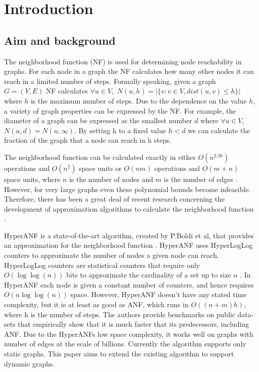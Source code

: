 \chapter{Introduction}

\section{Aim and background}
The neighborhood function (NF) is used for determining node reachability in graphs. For each node in a graph the NF calculates how many other nodes it can reach in a limited number of steps. Formally speaking, given a graph $G = (V,E)$ NF calculates $\forall u \in V,$ $N(u,h) = |\{v : v \in V, dist(u,v) \leq h \}|$ where $h$ is the maximum number of steps. Due to the dependence on the value $h$, a variety of graph properties can be expressed by the NF. For example, the diameter of a graph can be expressed as the smallest number $d$ where $ \forall u \in V$, $N(u,d) = N(u,\infty)$. By setting h to a fixed value $h < d$ we can calculate the fraction of the graph that a node can reach in h steps. 

The neighborhood function can be calculated exactly in either $O(n^{2.38})$ operations and $O(n^2)$ space units or $O(nm)$ operations and $O(m + n)$ space units, where $n$ is the number of nodes and $m$ is the number of edges \cite{Palmer01}. However, for very large graphs even these polynomial bounds become infeasible. Therefore, there has been a great deal of recent research concerning the development of approximation algorithms to calculate the neighborhood function \cite{Palmer01,anf,hyperanf}. 

HyperANF is a state-of-the-art algorithm, created by P.Boldi et al, that provides an approximation for the neighborhood function \cite{hyperanf}. HyperANF uses HyperLogLog counters to approximate the number of nodes a given node can reach. HyperLogLog counters are statistical counters that require only $O( \log\log (n))$ bits to approximate the cardinality of a set up to size $n$ \cite{hyperloglog}. In HyperANF each node is given a constant number of counters, and hence requires $O(n \log\log(n))$ space. However, HyperANF doesn't have any stated time complexity, but it is at least as good as ANF, which runs in $O((n+m)h)$, where h is the number of steps. The authors provide benchmarks on public data-sets that empirically show that it is much faster that its predecessors, including ANF. Due to the HyperANFs low space complexity, it works well on graphs with number of edges at the scale of billions. Currently the algorithm supports only static graphs. This paper aims to extend the existing algorithm to support dynamic graphs.

